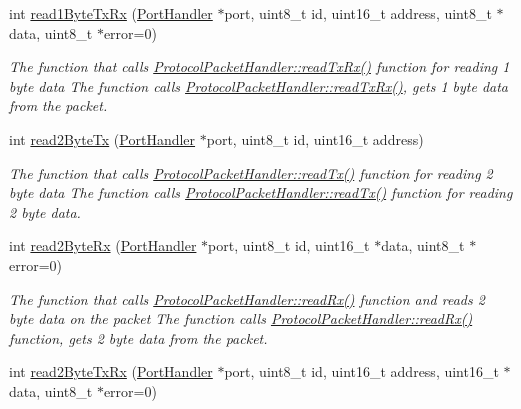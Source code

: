 \begin{DoxyCompactItemize}
int \hyperlink{classmercury_1_1_protocol_packet_handler_a1b5c51858c5bde55912fe5adf89df8a2}{read1\+Byte\+Tx\+Rx} (\hyperlink{classmercury_1_1_port_handler}{Port\+Handler} $\ast$port, uint8\+\_\+t id, uint16\+\_\+t address, uint8\+\_\+t $\ast$data, uint8\+\_\+t $\ast$error=0)
\begin{DoxyCompactList}\small\item\em The function that calls \hyperlink{classmercury_1_1_protocol_packet_handler_a368325ca9c0c783b1e88ef32a4544e51}{Protocol\+Packet\+Handler\+::read\+Tx\+Rx()} function for reading 1 byte data  The function calls \hyperlink{classmercury_1_1_protocol_packet_handler_a368325ca9c0c783b1e88ef32a4544e51}{Protocol\+Packet\+Handler\+::read\+Tx\+Rx()},  gets 1 byte data from the packet. \end{DoxyCompactList}\item 
int \hyperlink{classmercury_1_1_protocol_packet_handler_a39f55a7a7cb8f8bd9b4c2a1bfb84f855}{read2\+Byte\+Tx} (\hyperlink{classmercury_1_1_port_handler}{Port\+Handler} $\ast$port, uint8\+\_\+t id, uint16\+\_\+t address)
\begin{DoxyCompactList}\small\item\em The function that calls \hyperlink{classmercury_1_1_protocol_packet_handler_aebb2c28d6b3f2e87c7a56b757a24810b}{Protocol\+Packet\+Handler\+::read\+Tx()} function for reading 2 byte data  The function calls \hyperlink{classmercury_1_1_protocol_packet_handler_aebb2c28d6b3f2e87c7a56b757a24810b}{Protocol\+Packet\+Handler\+::read\+Tx()} function for reading 2 byte data. \end{DoxyCompactList}\item 
int \hyperlink{classmercury_1_1_protocol_packet_handler_a1d22ce94f06b67aa60172567d70330bf}{read2\+Byte\+Rx} (\hyperlink{classmercury_1_1_port_handler}{Port\+Handler} $\ast$port, uint8\+\_\+t id, uint16\+\_\+t $\ast$data, uint8\+\_\+t $\ast$error=0)
\begin{DoxyCompactList}\small\item\em The function that calls \hyperlink{classmercury_1_1_protocol_packet_handler_af7ff32d0eca6395b92bf7efc02118a27}{Protocol\+Packet\+Handler\+::read\+Rx()} function and reads 2 byte data on the packet  The function calls \hyperlink{classmercury_1_1_protocol_packet_handler_af7ff32d0eca6395b92bf7efc02118a27}{Protocol\+Packet\+Handler\+::read\+Rx()} function,  gets 2 byte data from the packet. \end{DoxyCompactList}\item 
int \hyperlink{classmercury_1_1_protocol_packet_handler_a13f3aa6d39e6ac6dd2af0dbcfabe2bd2}{read2\+Byte\+Tx\+Rx} (\hyperlink{classmercury_1_1_port_handler}{Port\+Handler} $\ast$port, uint8\+\_\+t id, uint16\+\_\+t address, uint16\+\_\+t $\ast$data, uint8\+\_\+t $\ast$error=0)

\end{DoxyCompactItemize}
